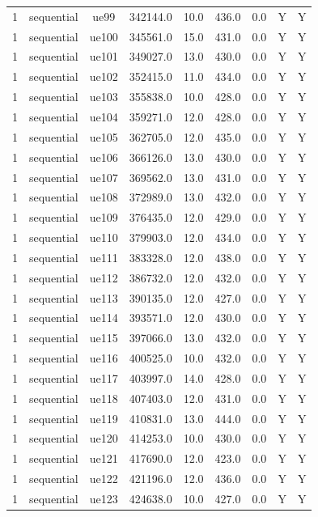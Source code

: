 \begin{table}[ht]
\begin{tabular}{|c|c|c|c|c|c|c|c|c|}
1 & sequential & ue99 & 342144.0 & 10.0 & 436.0 & 0.0 & Y & Y \\
1 & sequential & ue100 & 345561.0 & 15.0 & 431.0 & 0.0 & Y & Y \\
1 & sequential & ue101 & 349027.0 & 13.0 & 430.0 & 0.0 & Y & Y \\
1 & sequential & ue102 & 352415.0 & 11.0 & 434.0 & 0.0 & Y & Y \\
1 & sequential & ue103 & 355838.0 & 10.0 & 428.0 & 0.0 & Y & Y \\
1 & sequential & ue104 & 359271.0 & 12.0 & 428.0 & 0.0 & Y & Y \\
1 & sequential & ue105 & 362705.0 & 12.0 & 435.0 & 0.0 & Y & Y \\
1 & sequential & ue106 & 366126.0 & 13.0 & 430.0 & 0.0 & Y & Y \\
1 & sequential & ue107 & 369562.0 & 13.0 & 431.0 & 0.0 & Y & Y \\
1 & sequential & ue108 & 372989.0 & 13.0 & 432.0 & 0.0 & Y & Y \\
1 & sequential & ue109 & 376435.0 & 12.0 & 429.0 & 0.0 & Y & Y \\
1 & sequential & ue110 & 379903.0 & 12.0 & 434.0 & 0.0 & Y & Y \\
1 & sequential & ue111 & 383328.0 & 12.0 & 438.0 & 0.0 & Y & Y \\
1 & sequential & ue112 & 386732.0 & 12.0 & 432.0 & 0.0 & Y & Y \\
1 & sequential & ue113 & 390135.0 & 12.0 & 427.0 & 0.0 & Y & Y \\
1 & sequential & ue114 & 393571.0 & 12.0 & 430.0 & 0.0 & Y & Y \\
1 & sequential & ue115 & 397066.0 & 13.0 & 432.0 & 0.0 & Y & Y \\
1 & sequential & ue116 & 400525.0 & 10.0 & 432.0 & 0.0 & Y & Y \\
1 & sequential & ue117 & 403997.0 & 14.0 & 428.0 & 0.0 & Y & Y \\
1 & sequential & ue118 & 407403.0 & 12.0 & 431.0 & 0.0 & Y & Y \\
1 & sequential & ue119 & 410831.0 & 13.0 & 444.0 & 0.0 & Y & Y \\
1 & sequential & ue120 & 414253.0 & 10.0 & 430.0 & 0.0 & Y & Y \\
1 & sequential & ue121 & 417690.0 & 12.0 & 423.0 & 0.0 & Y & Y \\
1 & sequential & ue122 & 421196.0 & 12.0 & 436.0 & 0.0 & Y & Y \\
1 & sequential & ue123 & 424638.0 & 10.0 & 427.0 & 0.0 & Y & Y \\

\end{tabular}
\end{table}
